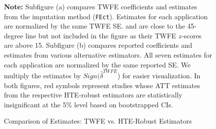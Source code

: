 \documentclass[12pt]{article}
\begin{document}
\begin{figure}[!ht]
  \caption{Comparison of Estimates: TWFE vs. HTE-Robust Estimators}\label{fg:twfe-v-hte}
  \centering
  \vspace{-0.5em}
  \begin{minipage}{1\linewidth}{
  \begin{center}  
  \vspace{-1em}
  \hspace{1em}
  \end{center}
  {\footnotesize\textbf{Note:} Subfigure (a) compares TWFE coefficients and estimates from the imputation method (\texttt{FEct}). Estimates for each application are normalized by the same TWFE SE. \cite{fh2018} and \citet{Hall2022} are close to the 45-degree line but not included in the figure as their TWFE $z$-scores are above 15. Subfigure (b) compares reported coefficients and estimates from various alternative estimators. All seven estimates for each application are normalized by the same reported SE. We multiply the estimates by $Sign(\hat\delta^{TWFE}$) for easier visualization.  In both figures, red symbols represent studies whose ATT estimates from the respective HTE-robust estimators are statistically insignificant at the 5\% level based on bootstrapped CIs. 
  }}
  \end{minipage}\vspace{-1em}
\end{figure}
\end{document}
